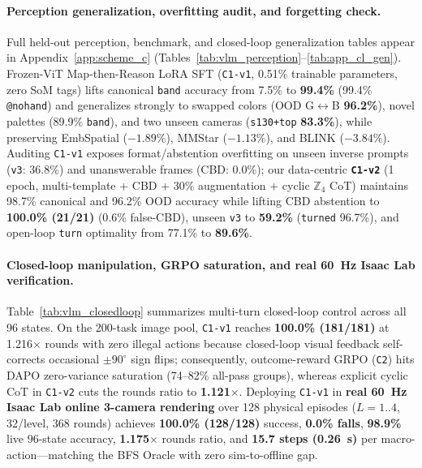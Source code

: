 \paragraph{Perception generalization, overfitting audit, and forgetting check.}
Full held-out perception, benchmark, and closed-loop generalization tables appear in Appendix~\ref{app:scheme_c} (Tables~\ref{tab:vlm_perception}--\ref{tab:app_cl_gen}).
Frozen-ViT Map-then-Reason LoRA SFT (\texttt{C1-v1}, 0.51\% trainable parameters, zero SoM tags) lifts canonical \texttt{band} accuracy from 7.5\% to \textbf{99.4\%} (99.4\% \texttt{@nohand}) and generalizes strongly to swapped colors (OOD G$\leftrightarrow$B \textbf{96.2\%}), novel palettes (89.9\% \texttt{band}), and two unseen cameras (\texttt{s130+top} \textbf{83.3\%}), while preserving EmbSpatial ($-1.89\%$), MMStar ($-1.13\%$), and BLINK ($-3.84\%$).
Auditing \texttt{C1-v1} exposes format/abstention overfitting on unseen inverse prompts (\texttt{v3}: 36.8\%) and unanswerable frames (CBD: 0.0\%); our data-centric \textbf{\texttt{C1-v2}} (1 epoch, multi-template + CBD + 30\% augmentation + cyclic $\mathbb{Z}_4$ CoT) maintains 98.7\% canonical and 96.2\% OOD accuracy while lifting CBD abstention to \textbf{100.0\% (21/21)} (0.6\% false-CBD), unseen \texttt{v3} to \textbf{59.2\%} (\texttt{turned} 96.7\%), and open-loop \texttt{turn} optimality from 77.1\% to \textbf{89.6\%}.

\paragraph{Closed-loop manipulation, GRPO saturation, and real 60~Hz Isaac Lab verification.}
Table~\ref{tab:vlm_closedloop} summarizes multi-turn closed-loop control across all 96 states.
On the 200-task image pool, \texttt{C1-v1} reaches \textbf{100.0\% (181/181)} at 1.216$\times$ rounds with zero illegal actions because closed-loop visual feedback self-corrects occasional $\pm 90^\circ$ sign flips; consequently, outcome-reward GRPO (\texttt{C2}) hits DAPO zero-variance saturation (74--82\% all-pass groups), whereas explicit cyclic CoT in \texttt{C1-v2} cuts the rounds ratio to \textbf{1.121$\times$}.
Deploying \texttt{C1-v1} in \textbf{real 60~Hz Isaac Lab online 3-camera rendering} over 128 physical episodes ($L=1..4$, 32/level, 368 rounds) achieves \textbf{100.0\% (128/128)} success, \textbf{0.0\% falls}, \textbf{98.9\%} live 96-state accuracy, \textbf{1.175$\times$} rounds ratio, and \textbf{15.7 steps (0.26~s)} per macro-action—matching the BFS Oracle with zero sim-to-offline gap.

